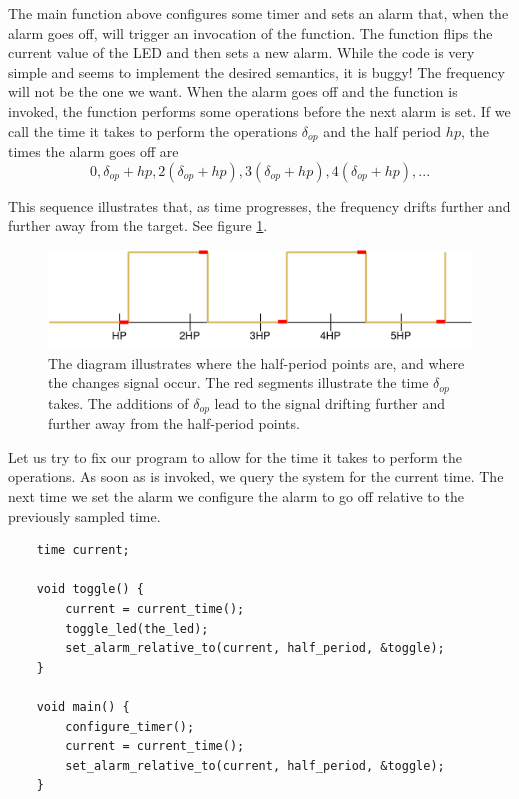 The main function above configures some timer and sets an alarm that, when the alarm goes off, will trigger an invocation of
the  function. The  function flips the current value of the LED and then sets a new alarm.
While the code is very simple and seems to implement the desired semantics, it is buggy! The frequency will not be
the one we want. When the alarm goes off and the function is invoked, the function performs some operations before the next
alarm is set. If we call the time it takes to perform the operations $\delta_{op}$ and the half period $hp$, the times the
alarm goes off are $$0, \delta_{op} + hp, 2(\delta_{op} + hp), 3(\delta_{op} + hp), 4(\delta_{op} + hp), ...$$

This sequence illustrates that, as time progresses, the frequency drifts further and further away from the target. See
figure \ref{graphics:drift}.

\begin{figure}
    \centering
    \includegraphics[scale=0.2]{graphics/drift.png}
    \caption{The diagram illustrates where the half-period points are, and where the changes signal occur. The red
    segments illustrate the time $\delta_{op}$ takes. The additions of $\delta_{op}$ lead to the signal drifting
    further and further away from the half-period points.}
    \label{graphics:drift}
\end{figure}

Let us try to fix our program to allow for the time it takes to perform the operations.
As soon as  is invoked, we query the system for the current time. The next time we set
the alarm we configure the alarm to go off relative to the previously sampled time.

\begin{verbatim}
    time current;

    void toggle() {
        current = current_time();
        toggle_led(the_led);
        set_alarm_relative_to(current, half_period, &toggle);
    }

    void main() {
        configure_timer();
        current = current_time();
        set_alarm_relative_to(current, half_period, &toggle);
    }
\end{verbatim}

